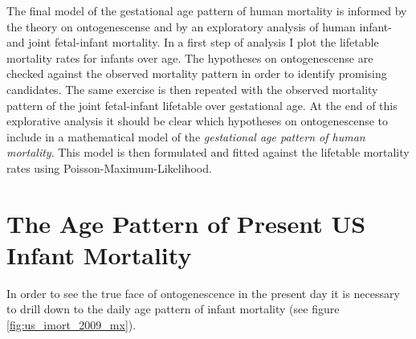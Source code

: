 \documentclass[
  12pt
]{scrartcl}
\begin{document}
The final model of the gestational age pattern of human mortality is informed by the theory on ontogenescense and by an exploratory analysis of human infant- and joint fetal-infant mortality. In a first step of analysis I plot the lifetable mortality rates for infants over age. The hypotheses on ontogenescense are checked against the observed mortality pattern in order to identify promising candidates. The same exercise is then repeated with the observed mortality pattern of the joint fetal-infant lifetable over gestational age. At the end of this explorative analysis it should be clear which hypotheses on ontogenescense to include in a mathematical model of the \emph{gestational age pattern of human mortality}. This model is then formulated and fitted against the lifetable mortality rates using Poisson-Maximum-Likelihood.

\section{The Age Pattern of Present US Infant Mortality} %
\label{sec:the_daily_age_pattern_of_present_day_us_infant_mortality}

In order to see the true face of ontogenescence in the present day it is necessary to drill down to the daily age pattern of infant mortality (see figure \ref{fig:us_imort_2009_mx}).
\end{document}
